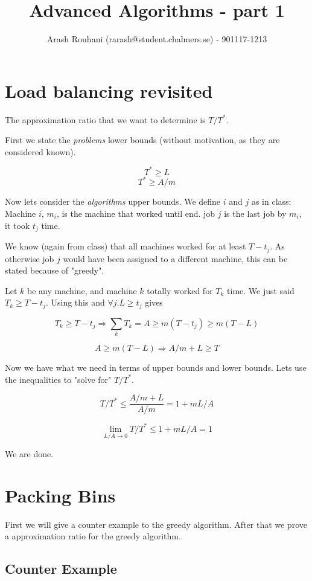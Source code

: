 \documentclass[a4paper,11pt]{article}
\title{Advanced Algorithms - part 1}
\author{Arash Rouhani (rarash@student.chalmers.se) - 901117-1213}
\begin{document}
\maketitle

\section{Load balancing revisited}
The approximation ratio that we want to determine is $T/T^*$.

First we state the \emph{problems} lower bounds (without motivation, as they
are considered known).

$$ T^* \geq L $$
$$ T^* \geq A/m $$

Now lets consider the \emph{algorithms} upper bounds. We define $i$ and $j$
as in class: Machine $i$, $m_i$, is the machine that worked until end.
job $j$ is the last job by $m_i$, it took $t_j$ time. 

We know (again from class) that all machines worked for at least $T - t_j$.
As otherwise job $j$ would have been assigned to a different machine,
this can be stated because of "greedy".

Let $k$ be any machine, and machine $k$ totally worked for $T_k$ time.
We just said $T_k \geq T - t_j$. Using this and $\forall j. L \geq t_j$ gives

\[
 T_k \geq T - t_j \Rightarrow \sum_{k} T_k = A \geq m(T-t_j) \geq m(T-L)
\]

\[
 A \geq m(T-L) \Rightarrow A/m + L \geq T
\]

Now we have what we need in terms of upper bounds and lower bounds.
Lets use the inequalities to "solve for" $T/T^*$.

\[
 T/T^* \leq \frac{A/m + L}{A/m} = 1 + mL/A
\]

\[
  \lim_{L/A \to 0} T/T^* \leq 1 + mL/A = 1
\]

We are done.

\section{Packing Bins}

First we will give a counter example to the greedy algorithm.
After that we prove a approximation ratio for the greedy algorithm.

\subsection{Counter Example}
\end{document}
